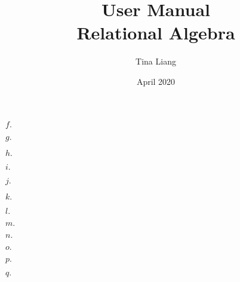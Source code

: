\documentclass{article}
\title{
  User Manual\\
  \large{Relational Algebra}
}
\author{Tina Liang}
\date{April 2020}
\begin{document}
$f.$\\
\hfill \break

$g.$\\
\hfill \break

$h.$\\
\hfill \break

$i.$\\
\hfill \break

$j.$\\
\hfill \break

$k.$\\
\hfill \break

$l.$\\
\hfill \break

$m.$\\
\hfill \break

$n.$\\
\hfill \break

$o.$\\
\hfill \break

$p.$\\
\hfill \break

$q.$\\
\end{document}
